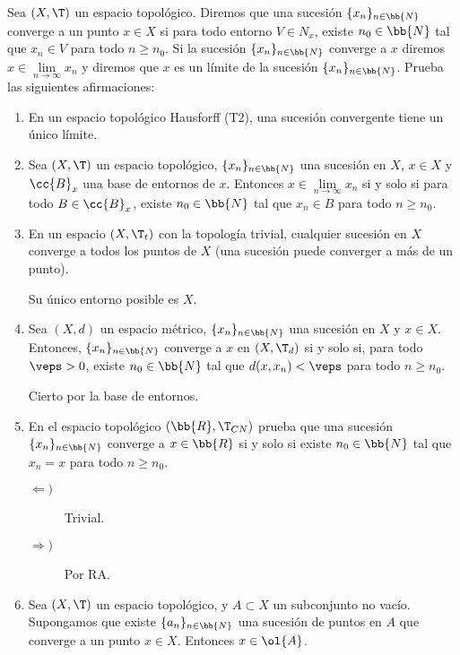 \begin{ejercicio}
    Sea $(X,\T)$ un espacio topológico. Diremos que una sucesión $\{x_n\}_{n\in \bb{N}}$ converge a un punto $x\in X$ si para todo entorno $V\in {N}_x$, existe $n_0\in \bb{N}$ tal que $x_n\in V$ para todo $n\geq n_0$. Si la sucesión $\{x_n\}_{n\in \bb{N}}$ converge a $x$ diremos $x\in \lim\limits_{n\to \infty} x_n$ y diremos que $x$ es un límite de la sucesión $\{x_n\}_{n\in \bb{N}}$. Prueba las siguientes afirmaciones:
    \begin{enumerate}[label=\alph*)]
        \item En un espacio topológico Hausforff (T2), una sucesión convergente tiene un único límite.

        \item Sea $(X, \T)$ un espacio topológico, $\{x_n\}_{n\in \bb{N}}$ una sucesión en $X$, $x\in X$ y $\cc{B}_x$ una base de entornos de $x$. Entonces $x\in \lim\limits_{n\to \infty}x_n$ si y solo si para todo $B\in \cc{B}_x$, existe $n_0\in \bb{N}$ tal que $x_n\in B$ para todo $n\geq n_0$.

        \item En un espacio $(X,\T_t)$ con la topología trivial, cualquier sucesión en $X$ converge a todos los puntos de $X$ (una sucesión puede converger a más de un punto).

        Su único entorno posible es $X$.

        \item Sea $(X,d)$ un espacio métrico, $\{x_n\}_{n\in \bb{N}}$ una sucesión en $X$ y $x\in X$. Entonces, $\{x_n\}_{n\in \bb{N}}$ converge a $x$ en $(X,\T_d)$ si y solo si, para todo $\veps>0$, existe $n_0\in \bb{N}$ tal que $d(x,x_n)<\veps$ para todo $n\geq n_0$.

        Cierto por la base de entornos.

        \item En el espacio topológico $(\bb{R}, \T_{CN})$ prueba que una sucesión $\{x_n\}_{n\in \bb{N}}$ converge a $x\in \bb{R}$ si y solo si existe $n_0\in \bb{N}$ tal que $x_n=x$ para todo $n\geq n_0$.

        \begin{description}
            \item[$\Longleftarrow)$] Trivial.
            \item[$\Longrightarrow)$] Por RA. 
        \end{description}

        \item Sea $(X,\T)$ un espacio topológico, y $A\subset X$ un subconjunto no vacío. Supongamos que existe $\{a_n\}_{n\in \bb{N}}$ una sucesión de puntos en $A$ que converge a un punto $x\in X$. Entonces $x\in \ol{A}$.


\end{enumerate}
\end{ejercicio}
